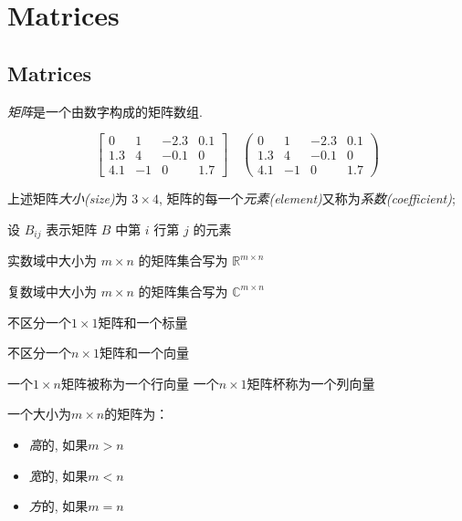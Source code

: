 \chapter{Matrices}

\section{Matrices}

\begin{definition}[矩阵]
    \textit{矩阵}是一个由数字构成的矩阵数组. 

    $$ \left[\begin{array}{cccc}0 & 1 & -2.3 & 0.1 \\ 1.3 & 4 & -0.1 & 0 \\ 4.1 & -1 & 0 & 1.7\end{array}\right] \quad  \left(\begin{array}{cccc}0 & 1 & -2.3 & 0.1 \\ 1.3 & 4 & -0.1 & 0 \\ 4.1 & -1 & 0 & 1.7\end{array}\right)  $$

    上述矩阵\textit{大小(size)}为 $3\times 4$, 矩阵的每一个\textit{元素(element)}又称为\textit{系数(coefficient)};
\end{definition}

\begin{notation}
    设 $ B_{i j} $ 表示矩阵 $ B $ 中第 $ i $ 行第 $ j $ 的元素

    实数域中大小为 $ m \times n $ 的矩阵集合写为 $ \mathbb{R}^{m \times n} $

    复数域中大小为 $ m \times n $ 的矩阵集合写为 $ \mathbb{C}^{m \times n} $
\end{notation}

\begin{definition}[标量]
    不区分一个$1\times 1$矩阵和一个标量
\end{definition}

\begin{definition}[向量]
    不区分一个$n\times 1$矩阵和一个向量
\end{definition}

\begin{definition}
    一个$1\times n$矩阵被称为一个行向量
    一个$n\times 1$矩阵杯称为一个列向量
\end{definition}

\begin{definition}[高形, 宽形和方形矩阵]
    一个大小为$m\times n$的矩阵为：
    \begin{itemize}
        \item \textit{高}的, 如果$m>n$
        \item \textit{宽}的, 如果$m<n$
        \item \textit{方}的, 如果$m=n$
    \end{itemize}
\end{definition}

